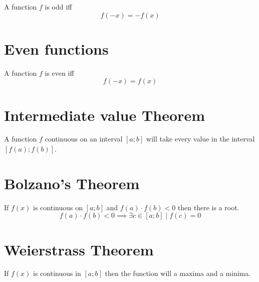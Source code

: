 \documentclass{article}
\begin{document}
A function \(f\) is odd iff
\[
    f(-x) = -f(x)
\]

\section{Even functions}

A function \(f\) is even iff
\[
    f(-x) = f(x)
\]

\section{Intermediate value Theorem}

A function \(f\) continuous on an interval \([a;b]\) will take
every value in the interval \([f(a);f(b)]\).

\section{Bolzano's Theorem}

If \(f(x)\) is continuous on \([a;b]\) and \(f(a)\cdot f(b) <0\) then there is a root.
\[
    f(a)\cdot f(b) <0 \implies \exists c \in [a;b] \mid f(c) = 0
\]

\section{Weierstrass Theorem}

If \(f(x)\) is continuous in \([a;b]\) then the function will a maxima and a minima.
\end{document}

